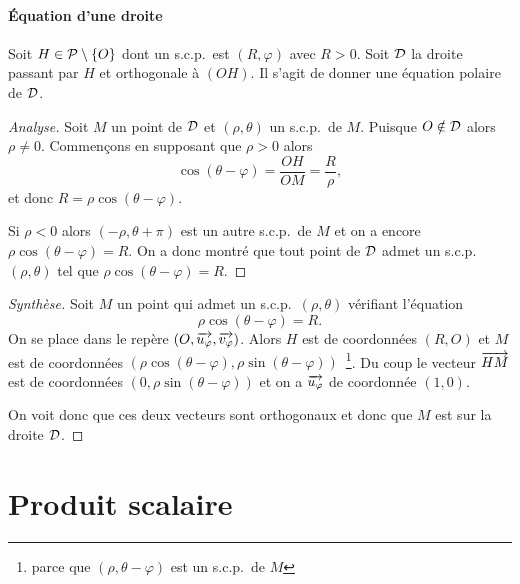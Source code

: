 \paragraph{Équation d'une droite}
\label{par:eqdroite}
Soit \(H \in \P\setminus\{O\}\) dont un s.c.p.\ est \((R,\varphi)\) avec \(R>0\). Soit \(\Dr\) la droite passant par \(H\) et orthogonale à \((OH)\). Il s'agit de donner une équation polaire de \(\Dr\).
\begin{proof}[Analyse]
  Soit \(M\) un point de \(\Dr\) et \((\rho,\theta)\) un s.c.p.\ de \(M\). Puisque \(O \notin \Dr\) alors \(\rho \neq 0\). Commençons en supposant que \(\rho>0\) alors
  \begin{equation}
    \cos(\theta-\varphi)=\frac{OH}{OM}=\frac{R}{\rho},
  \end{equation}
  et donc \(R=\rho \cos(\theta-\varphi)\). 

  Si \(\rho<0\) alors \((-\rho,\theta+\pi)\) est un autre s.c.p.\ de \(M\) et on a encore \(\rho\cos(\theta-\varphi)=R\). On a donc montré que tout point de \(\Dr\) admet un s.c.p.\ \((\rho, \theta)\) tel que \(\rho\cos(\theta-\varphi)=R\).
\end{proof}
\begin{proof}[Synthèse]
Soit \(M\) un point qui admet un s.c.p.\ \((\rho,\theta)\) vérifiant l'équation
\begin{equation}
  \rho\cos(\theta-\varphi)=R.
\end{equation}
On se place dans le repère \((O,\vect{u_\varphi}, \vect{v_\varphi})\). Alors \(H\) est de coordonnées \((R,O)\) et \(M\) est de coordonnées \((\rho\cos(\theta-\varphi), \rho\sin(\theta-\varphi))\)~\footnote{parce que \((\rho, \theta-\varphi)\) est un s.c.p.\ de \(M\)}. Du coup le vecteur \(\vect{HM}\) est de coordonnées \((0, \rho\sin(\theta-\varphi))\) et on a \(\vect{u_\varphi}\) de coordonnée \((1,0)\). 

On voit donc que ces deux vecteurs sont orthogonaux et donc que \(M\) est sur la droite \(\Dr\).
\end{proof}

\section{Produit scalaire}
\label{sec:prodscalaire}
